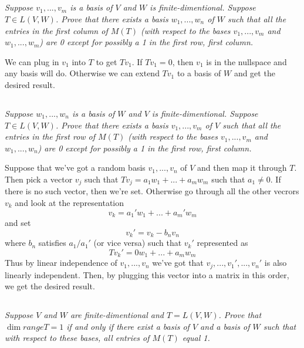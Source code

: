 \documentclass[11pt,oneside,titlepage]{book}
\begin{document}
\subsection{}

\textit{Suppose $v_1, ..., v_m$ is a basis of $V$ and $W$ is finite-dimentional. Suppose
  $T \in L(V, W)$. Prove that there exists a basis $w_1, ..., w_n$ of $W$ such that
  all the entries in the first column of $M(T)$ (with respect to the bases $v_1, ..., v_m$ and
  $w_1, ..., w_m$) are 0 except for possibly a 1 in the first row, first column.}

We can plug in $v_1$ into $T$ to get $T v_1$. If $T v_1 = 0$, then $v_1$ is in the nullspace
and any basis will do. Otherwise we can extend $T v_1$ to a basis of $W$ and get the desired
result.

\subsection{}

\textit{Suppose $w_1, ..., w_n$ is a basis of $W$ and $V$ is finite-dimentional. Suppose
  $T \in L(V, W)$. Prove that there exists a basis $v_1, ..., v_m$ of $V$ such that
  all the entries in the first row of $M(T)$ (with respect to the bases $v_1, ..., v_m$ and
  $w_1, ..., w_n$) are 0 except for possibly a 1 in the first row, first column.}

Suppose that we've got a random basis $v_1, ..., v_n$  of $V$ and then
map it through $T$. Then pick a vector $v_j$ such that $T v_j = a_1 w_1 + ... + a_m w_m$
such that $a_1 \neq 0$. If there is no such vector, then we're set. Otherwise go
through all the other vecrors $v_k$ and look at the representation
$$v_k = a_1' w_1 + ... + a_m' w_m$$
and set 
$$v_k'  = v_k - b_n v_n$$
where $b_n$ satisfies $a_1/a_1'$ (or vice versa) such that $v_k'$ represented as
$$T v_k' = 0 w_1 + ... + a_m w_m$$
Thus by linear independence of $v_1, ..., v_n$ we've got that $v_j, ..., v_1', ..., v_n'$ is
also linearly independent. Then, by plugging this vector into a matrix in this order, we
get the desired result.

\subsection{}

\textit{Suppose $V$ and $W$ are finite-dimentional and $T = L(V, W)$. Prove that
  $\dim range T = 1$ if and only if there exist a basis of $V$ and a basis of $W$
  such that with respect to these bases, all entries of $M(T)$ equal 1.}
\end{document}
